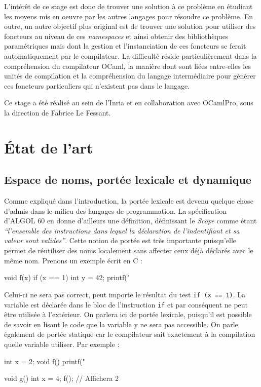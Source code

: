 \documentclass[11pt,a4paper]{report}
\begin{document}
L'intérêt de ce stage est donc de trouver une solution à ce problème en étudiant
les moyens mis en oeuvre par les autres langages pour résoudre ce problème. En
outre, un autre objectif plus original est de trouver une solution pour utiliser
des foncteurs au niveau de ces \emph{namespaces} et ainsi obtenir des
bibliothèques paramétriques mais dont la gestion et l'instanciation de ces
foncteurs se ferait automatiquement par le compilateur. La difficulté réside
particulièrement dans la compréhension du compilateur OCaml, la manière dont
sont liées entre-elles les unités de compilation et la compréhension du langage
intermédiaire pour générer ces foncteurs particuliers qui n'existent pas dans le
langage.

Ce stage a été réalisé au sein de l'Inria et en collaboration avec OCamlPro,
sous la direction de Fabrice Le Fessant.

\chapter{\'{E}tat de l'art}

\section{Espace de noms, portée lexicale et dynamique}

Comme expliqué dans l'introduction, la portée lexicale est devenu quelque chose
d'admis dans le milieu des langages de programmation. La spécification d'ALGOL
60 \cite{Naur:1960:RAL:367236.367262} en donne d'ailleurs une définition,
définissant le \emph{Scope} comme étant \emph{``l'ensemble des instructions dans
  lequel la déclaration de l'indentifiant et sa valeur sont
  valides''}. Cette notion de portée est très importante puisqu'elle permet de
réutiliser des noms localement sans affecter ceux déjà déclarés avec le même
nom. Prenons un exemple écrit en C :
\begin{C}
void f(x) {
  if (x == 1) {
    int y = 42;
  }
  printf("%
}
\end{C}
Celui-ci ne sera pas correct, peut importe le résultat du test \texttt{if (x ==
  1)}. La variable est déclarée dans le bloc de l'instruction \texttt{if} et par
conséquent ne peut être utilisée à l'extérieur. On parlera ici de portée
lexicale, puisqu'il est possible de savoir en lisant le code que la variable y
ne sera pas accessible. On parle également de portée statique car le compilateur
sait exactement à la compilation quelle variable utiliser. Par exemple :
\begin{C}
int x = 2;
void f() {
  printf("%
}

void g() {
  int x = 4;
  f(); // Affichera 2
}
\end{C}
\end{document}
